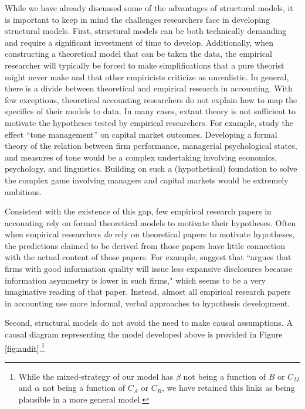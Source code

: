 While we have already discussed some of the advantages of structural models, it is important to keep in mind the challenges researchers face in developing structural models. 
First, structural models can be both technically demanding and require a significant investment of time to develop. 
Additionally, when constructing a theoretical model that can be taken the data, the empirical researcher will typically be forced to make simplifications that a pure theorist might never make and that other empiricists criticize as unrealistic.
In general, there is a divide between theoretical and empirical research in accounting.
With few exceptions, theoretical accounting researchers do not explain how to map the specifics of their models to data. 
In many cases, extant theory is not sufficient to motivate the hypotheses tested by empirical researchers.
For example, \citet{Huang:2014cs} study the effect ``tone management'' on capital market outcomes. 
Developing a formal theory of the relation between firm performance, managerial psychological states, and measures of tone would be a complex undertaking involving economics, psychology, and linguistics.
Building on such a (hypothetical) foundation to solve the complex game involving managers and capital markets would be extremely ambitious.

Consistent with the existence of this gap, few empirical research papers in accounting rely on formal theoretical models to motivate their hypotheses. 
Often when empirical researchers \emph{do} rely on theoretical papers to motivate hypotheses, the predictions claimed to be derived from those papers have little connection with the actual content of those papers.
For example, \citet{Hollander:2010jg} suggest that \citet{Verrecchia:1983} ``argues that firms with good information quality will issue less expansive disclosures because information asymmetry is lower in such firms," which seems to be a very imaginative reading of that paper.
Instead, almost all empirical research papers in accounting use more informal, verbal approaches to hypothesis development. 



Second, structural models do not avoid the need to make causal assumptions.
A causal diagram representing the model developed above is provided in Figure \ref{fig:audit}.\footnote{
While the mixed-strategy of our model has $\beta$ not being a function of $B$ or $C_M$ and $\alpha$ not being a function of $C_A$ or $C_R$, we have retained this links as being plausible in a more general model.}

